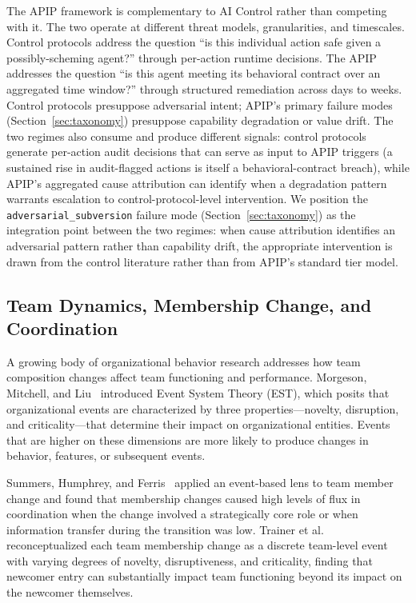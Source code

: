 \documentclass[conference]{IEEEtran}
\begin{document}
The APIP framework is complementary to AI Control rather than competing with
it. The two operate at different threat models, granularities, and timescales.
Control protocols address the question ``is this individual action safe given a
possibly-scheming agent?'' through per-action runtime decisions. The APIP
addresses the question ``is this agent meeting its behavioral contract over an
aggregated time window?'' through structured remediation across days to weeks.
Control protocols presuppose adversarial intent; APIP's primary failure modes
(Section~\ref{sec:taxonomy}) presuppose capability degradation or value drift.
The two regimes also consume and produce different signals: control protocols
generate per-action audit decisions that can serve as input to APIP triggers (a
sustained rise in audit-flagged actions is itself a behavioral-contract
breach), while APIP's aggregated cause attribution can identify when a
degradation pattern warrants escalation to control-protocol-level intervention.
We position the \texttt{adversarial\_subversion} failure mode
(Section~\ref{sec:taxonomy}) as the integration point between the two regimes:
when cause attribution identifies an adversarial pattern rather than capability
drift, the appropriate intervention is drawn from the control literature rather
than from APIP's standard tier model.

\subsection{Team Dynamics, Membership Change, and Coordination}
\label{subsec:team-dynamics}

A growing body of organizational behavior research addresses how team
composition changes affect team functioning and performance. Morgeson,
Mitchell, and Liu~\cite{morgeson2015event} introduced Event System Theory
(EST), which posits that organizational events are characterized by three
properties---novelty, disruption, and criticality---that determine their impact
on organizational entities. Events that are higher on these dimensions are more
likely to produce changes in behavior, features, or subsequent events.

Summers, Humphrey, and Ferris~\cite{summers2012team} applied an event-based
lens to team member change and found that membership changes caused high levels
of flux in coordination when the change involved a strategically core role or
when information transfer during the transition was low. Trainer et
al.~\cite{trainer2020membership} reconceptualized each team membership change as
a discrete team-level event with varying degrees of novelty, disruptiveness,
and criticality, finding that newcomer entry can substantially impact team
functioning beyond its impact on the newcomer themselves.
\end{document}
